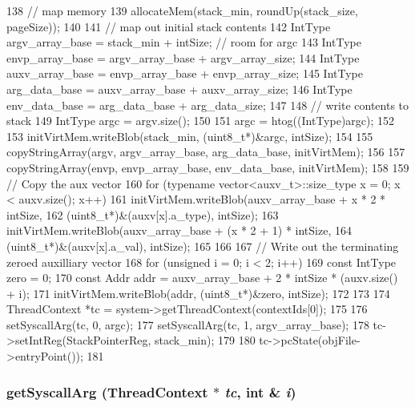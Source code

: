 \begin{DoxyCode}
{138     // map memory
139     allocateMem(stack_min, roundUp(stack_size, pageSize));
140 
141     // map out initial stack contents
142     IntType argv_array_base = stack_min + intSize; // room for argc
143     IntType envp_array_base = argv_array_base + argv_array_size;
144     IntType auxv_array_base = envp_array_base + envp_array_size;
145     IntType arg_data_base = auxv_array_base + auxv_array_size;
146     IntType env_data_base = arg_data_base + arg_data_size;
147 
148     // write contents to stack
149     IntType argc = argv.size();
150 
151     argc = htog((IntType)argc);
152 
153     initVirtMem.writeBlob(stack_min, (uint8_t*)&argc, intSize);
154 
155     copyStringArray(argv, argv_array_base, arg_data_base, initVirtMem);
156 
157     copyStringArray(envp, envp_array_base, env_data_base, initVirtMem);
158 
159     // Copy the aux vector
160     for (typename vector<auxv_t>::size_type x = 0; x < auxv.size(); x++) {
161         initVirtMem.writeBlob(auxv_array_base + x * 2 * intSize,
162                 (uint8_t*)&(auxv[x].a_type), intSize);
163         initVirtMem.writeBlob(auxv_array_base + (x * 2 + 1) * intSize,
164                 (uint8_t*)&(auxv[x].a_val), intSize);
165     }
166 
167     // Write out the terminating zeroed auxilliary vector
168     for (unsigned i = 0; i < 2; i++) {
169         const IntType zero = 0;
170         const Addr addr = auxv_array_base + 2 * intSize * (auxv.size() + i);
171         initVirtMem.writeBlob(addr, (uint8_t*)&zero, intSize);
172     }
173 
174     ThreadContext *tc = system->getThreadContext(contextIds[0]);
175 
176     setSyscallArg(tc, 0, argc);
177     setSyscallArg(tc, 1, argv_array_base);
178     tc->setIntReg(StackPointerReg, stack_min);
179 
180     tc->pcState(objFile->entryPoint());
181 }
\end{DoxyCode}
\hypertarget{classMipsLiveProcess_ae30d5e2e0fa415fc951786462325dde3}{
\subsubsection[{getSyscallArg}]{ getSyscallArg ({\bf ThreadContext} $\ast$ {\em tc}, \/  int \& {\em i})}}
\label{classMipsLiveProcess_ae30d5e2e0fa415fc951786462325dde3}


